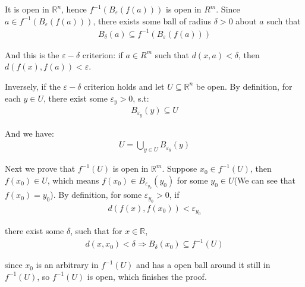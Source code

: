 \documentclass[]{ctexart}
\begin{document}
		It is open in $\mathbb{R}^n$, hence $f^{-1}(B_{\varepsilon}(f(a)))$ is open in $ R^m $. Since $a\in f^{-1}(B_{\varepsilon}(f(a)))$, there exists some ball of radius $\delta>0$ about $a$ such that
			\begin{equation*}
			\begin{aligned}
				B_{\delta}(a)\subseteq f^{-1}(B_{\varepsilon}(f(a)))
			\end{aligned}
			\end{equation*}
			
		And this is the $\varepsilon-\delta$ criterion: if $a\in R^m$ such that $d(x,a)<\delta$, then $d(f(x),f(a))<\varepsilon$.
		
		Inversely, if the $\varepsilon-\delta$ criterion holds and let $U\subseteq \mathbb{R}^n$ be open. By definition, for each $y\in U$, there exist some $\varepsilon_y>0$, s.t:
			\begin{equation*}
			\begin{aligned}
				B_{\varepsilon_y}(y)\subseteq  U
			\end{aligned}
			\end{equation*}
		
		And we have:
			\begin{equation*}
			\begin{aligned}
				U=\bigcup_{y\in U}B_{\varepsilon_y}(y)
			\end{aligned}
			\end{equation*}
		
		Next we prove that $f^{-1}(U)$ is open in $ \mathbb{R}^m $. Suppose $x_0\in f^{-1}(U)$, then $f(x_0)\in U$, which means $f(x_0)\in B_{\varepsilon_{y_0}}(y_0)$ for some $y_0\in U$(We can see that $f(x_0)=y_0$). By definition, for some $\varepsilon_{y_0}>0$, if 
			\begin{equation*}
			\begin{aligned}
				d(f(x),f(x_0))<\varepsilon_{y_0}
			\end{aligned}
			\end{equation*}
		
		there exist some $\delta$, such that for $x\in \mathbb{R}$, 
			\begin{equation*}
			\begin{aligned}
				d(x,x_0)<\delta\Rightarrow B_{\delta}(x_0)\subseteq f^{-1}(U)
			\end{aligned}
			\end{equation*}
			
		since $x_0$ is an arbitrary in $f^{-1}(U)$ and has a open ball around it still in $f^{-1}(U)$, so $f^{-1}(U)$ is open, which finishes the proof. 
			
\end{document}
